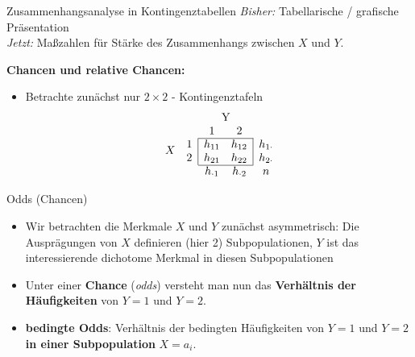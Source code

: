 \documentclass[
  10pt,
  ignorenonframetext,
]{beamer}
\providecommand{\tightlist}{%
  \setlength{\itemsep}{0pt}\setlength{\parskip}{0pt}}
\begin{document}
\begin{frame}{Zusammenhangsanalyse in Kontingenztabellen}
\label{zusammenhangsanalyse-in-kontingenztabellen}
\emph{Bisher:} Tabellarische / grafische Präsentation\\
\emph{Jetzt:} Maßzahlen für Stärke des Zusammenhangs zwischen \(X\) und
\(Y\).

\textbf{Chancen und relative Chancen:}

\begin{itemize}
\tightlist
\item
  Betrachte zunächst nur \(2 \times 2\) - Kontingenztafeln
  \begin{displaymath}
   \begin{array}{cc|cc|c}
   & \multicolumn{1}{c}{}
     & \multicolumn{2}{c}{$Y$}\\
   & \multicolumn{1}{c}{}
     & 1
    & \multicolumn{1}{c}{2} \\\cline{3-4}
   & 1
     & h_{11}
    & h_{12}
      & h_{1\cdot}\\
   \raisebox{1.5ex}[-1.5ex]{$X$}
   & 2
     & h_{21}
    & h_{22}
      & h_{2\cdot}\\\cline{3-4}
   & \multicolumn{1}{c}{}
     &\multicolumn{1}{c}{h_{\cdot 1}}
    & \multicolumn{1}{c}{h_{\cdot 2} }
      & \multicolumn{1}{c}{n}
   \end{array}
   \end{displaymath}
\end{itemize}
\end{frame}

\begin{frame}{Odds (Chancen)}
\label{odds-chancen-1}
\begin{itemize}
\tightlist
\item
  Wir betrachten die Merkmale \(X\) und \(Y\) zunächst asymmetrisch: Die
  Ausprägungen von \(X\) definieren (hier 2) Subpopulationen, \(Y\) ist
  das interessierende dichotome Merkmal in diesen Subpopulationen
\item
  Unter einer \textbf{Chance} (\emph{odds}) versteht man nun das
  \textbf{Verhältnis der Häufigkeiten} von \(Y=1\) und \(Y=2\).
\item
  \textbf{bedingte Odds}: Verhältnis der bedingten Häufigkeiten von
  \(Y=1\) und \(Y=2\) \textbf{in einer Subpopulation} \(X=a_i\).
\end{itemize}
\end{frame}
\end{document}
